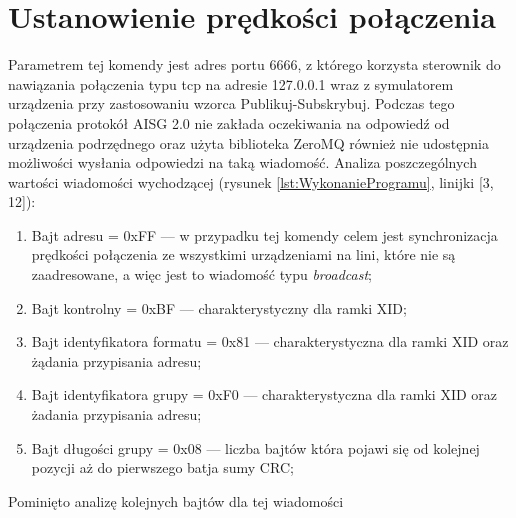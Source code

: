     \section{Ustanowienie prędkości połączenia}
    Parametrem tej komendy jest adres portu 6666, z którego korzysta sterownik do nawiązania połączenia typu tcp na adresie 127.0.0.1 wraz z symulatorem urządzenia
    przy zastosowaniu wzorca Publikuj-Subskrybuj. Podczas tego połączenia protokół AISG 2.0 nie zakłada oczekiwania na odpowiedź od urządzenia podrzędnego oraz użyta biblioteka
    ZeroMQ również nie udostępnia możliwości wysłania odpowiedzi na taką wiadomość.
    \newline
	Analiza poszczególnych wartości wiadomości wychodzącej (rysunek \ref{lst:WykonanieProgramu}, linijki [3, 12]):
	\begin{enumerate}
        \item Bajt adresu = 0xFF --- w przypadku tej komendy celem jest synchronizacja prędkości połączenia ze wszystkimi urządzeniami na lini, 
        które nie są zaadresowane, a więc jest to wiadomość typu \textit{broadcast};
        \item Bajt kontrolny = 0xBF --- charakterystyczny dla ramki XID;
        \item Bajt identyfikatora formatu = 0x81 --- charakterystyczna dla ramki XID oraz żądania przypisania adresu;
        \item Bajt identyfikatora grupy = 0xF0 --- charakterystyczna dla ramki XID oraz żadania przypisania adresu;
        \item Bajt długości grupy = 0x08 --- liczba bajtów która pojawi się od kolejnej pozycji aż do pierwszego batja sumy CRC;
    \end{enumerate}
    Pominięto analizę kolejnych bajtów dla tej wiadomości %

